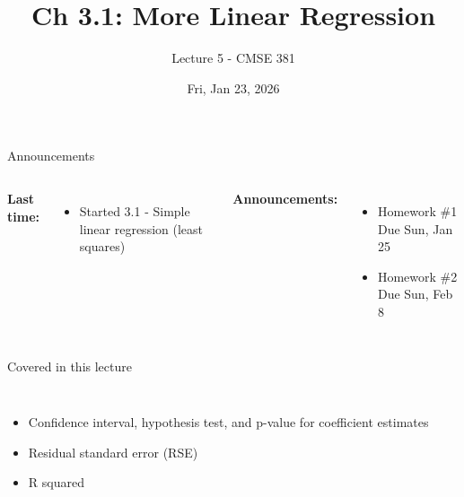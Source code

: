 \documentclass[aspectratio=169,usenames,dvipsnames]{beamer}
\begin{document}
\title[]{Ch 3.1: More Linear Regression}
\subtitle{Lecture 5 - CMSE 381}
\date{Fri, Jan 23, 2026}





\begin{frame}
 \titlepage


\end{frame}
\begin{frame}[c]{Announcements}

\begin{columns}
\centering

	\textbf{Last time:}
	\begin{itemize}
		\item Started 3.1 - Simple linear regression (least squares)
	\end{itemize}
\centering

	\textbf{Announcements:}
	\begin{itemize}
		\item Homework \#1 Due Sun, Jan 25
		\item Homework \#2 Due Sun, Feb 8
	\end{itemize}
\end{columns}

\end{frame}
\begin{frame}[c]{Covered in this lecture }

\begin{columns}
\centering
\begin{itemize}
	\item Confidence interval, hypothesis test, and p-value for coefficient estimates
	\item Residual standard error (RSE)
	\item R squared
\end{itemize}
\centering

\end{columns}

\end{frame}
\end{document}
